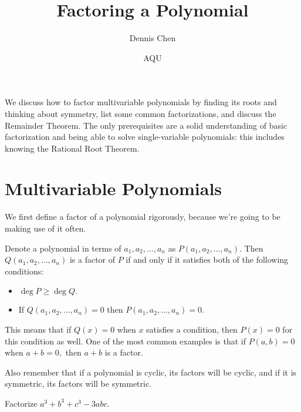 \documentclass[mast]{lucky}
\title{Factoring a Polynomial}
\author{Dennis Chen}
\date{AQU}
\begin{document}
\maketitle
We discuss how to factor multivariable polynomials by finding its roots and thinking about symmetry, list some common factorizations, and discuss the Remainder Theorem. The only prerequisites are a solid understanding of basic factorization and being able to solve single-variable polynomials: this includes knowing the Rational Root Theorem.

\section{Multivariable Polynomials}
We first define a factor of a polynomial rigorously, because we're going to be making use of it often.

\begin{defi}
Denote a polynomial in terms of $a_1,a_2,\ldots,a_n$ as $P(a_1,a_2,\ldots,a_n).$ Then $Q(a_1,a_2,\ldots,a_n)$ is a factor of $P$ if and only if it satisfies both of the following conditions:
\begin{itemize}
     \item $\deg P\geq \deg Q.$
     \item If $Q(a_1,a_2,\ldots,a_n)=0$ then $P(a_1,a_2,\ldots,a_n)=0.$
\end{itemize}
\end{defi}
This means that if $Q(x)=0$ when $x$ satisfies a condition, then $P(x)=0$ for this condition as well. One of the most common examples is that if $P(a,b)=0$ when $a+b=0,$ then $a+b$ is a factor.

Also remember that if a polynomial is cyclic, its factors will be cyclic, and if it is symmetric, its factors will be symmetric.

\begin{exam}
Factorize $a^3+b^3+c^3-3abc.$
\end{exam}
\end{document}
